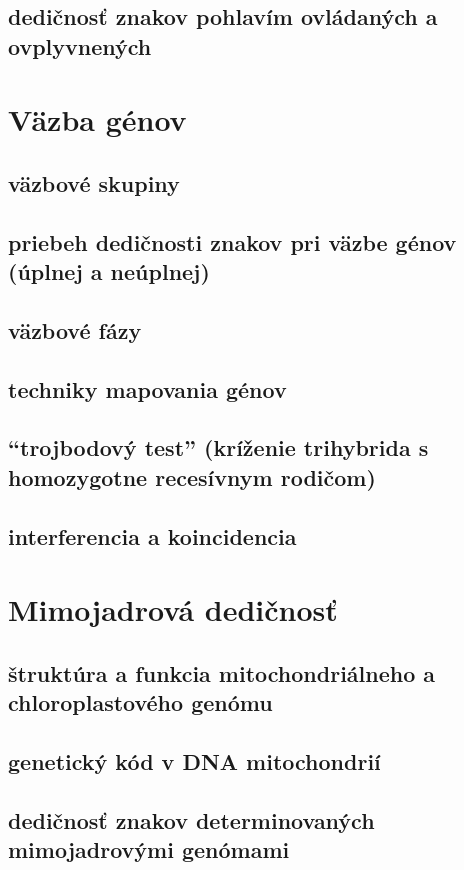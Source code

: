 \subsection*{dedičnosť znakov pohlavím ovládaných a ovplyvnených}

\section{Väzba génov}
\subsection*{väzbové skupiny}
\subsection*{priebeh dedičnosti znakov pri väzbe génov (úplnej a neúplnej)}
\subsection*{väzbové fázy}
\subsection*{techniky mapovania génov}
\subsection*{“trojbodový test” (kríženie trihybrida s homozygotne recesívnym rodičom)}
\subsection*{interferencia a koincidencia}

\section{Mimojadrová dedičnosť}
\subsection*{štruktúra a funkcia mitochondriálneho a chloroplastového genómu}
\subsection*{genetický kód v DNA mitochondrií}
\subsection*{dedičnosť znakov determinovaných mimojadrovými genómami}
